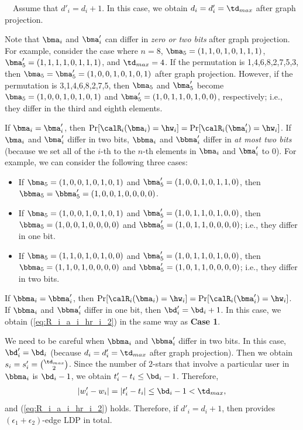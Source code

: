 \smallskip
{}~~Assume that $d'_i = d_i + 1$. 
In this case, we obtain $d_i = d'_i = \td_{max}$ after graph projection. 

Note that $\bma_i$ and $\bma'_i$ can differ in \textit{zero or two bits} after graph projection. 
For example, consider the case where $n=8$, $\bma_5=(1,1,0,1,0,1,1,1)$, $\bma'_5=(1,1,1,1,0,1,1,1)$, and $\td_{max}=4$. 
If the permutation is 1,4,6,8,2,7,5,3, then $\bma_5=\bma'_5=(1,0,0,1,0,1,0,1)$ after graph projection. 
However, if the permutation is 3,1,4,6,8,2,7,5, then $\bma_5$ and $\bma'_5$ become $\bma_5=(1,0,0,1,0,1,0,1)$ and $\bma'_5=(1,0,1,1,0,1,0,0)$, respectively; i.e., they differ in the third and eighth elements. 

If $\bma_i=\bma'_i$, then $\Pr[\calR_i(\bma_i) = \hw_i] = \Pr[\calR_i(\bma'_i) = \hw_i]$. 
If $\bma_i$ and $\bma'_i$ differ in two bits, $\bbma_i$ and $\bbma'_i$ differ in \textit{at most two bits} (because we set all of the $i$-th to the $n$-th elements in $\bma_i$ and $\bma'_i$ to $0$). 
For example, we can consider the following three cases:
\begin{itemize}
    \item If $\bma_5=(1,0,0,1,0,1,0,1)$ and $\bma'_5=(1,0,0,1,0,1,1,0)$, then $\bbma_5=\bbma'_5=(1,0,0,1,0,0,0,0)$. 
    \item If $\bma_5=(1,0,0,1,0,1,0,1)$ and $\bma'_5=(1,0,1,1,0,1,0,0)$, then $\bbma_5=(1,0,0,1,0,0,0,0)$ and $\bbma'_5=(1,0,1,1, 0,0,\allowbreak0,0)$; i.e., they differ in one bit. 
    \item If $\bma_5=(1,1,0,1,0,1,0,0)$ and $\bma'_5=(1,0,1,1,0,1,0,0)$, then $\bbma_5=(1,1,0,1,0,0,0,0)$ and $\bbma'_5=(1,0,1,1,0,0,\allowbreak0,0)$; i.e., they differ in two bits.
\end{itemize}
If $\bbma_i=\bbma'_i$, then $\Pr[\calR_i(\bma_i) = \hw_i] = \Pr[\calR_i(\bma'_i) = \hw_i]$. 
If $\bbma_i$ and $\bbma'_i$ differ in one bit, then $\bd'_i = \bd_i + 1$. 
In this case, we obtain (\ref{eq:R_i_a_i_hr_i_2}) in the same way as \textbf{Case 1}. 

We need to be careful when $\bbma_i$ and $\bbma'_i$ differ in two bits. 
In this case, $\bd'_i = \bd_i$ (because $d_i = d'_i = \td_{max}$ after graph projection). 
Then we obtain $s_i = s'_i = \binom{\td_{max}}{2}$. 
Since the number of $2$-stars that involve a particular user in $\bbma_i$ is $\bd_i - 1$, we obtain $t'_i - t_i \leq \bd_i - 1$. Therefore,
\begin{align*}
|w'_i - w_i| = |t'_i - t_i| \leq \bd_i - 1 < \td_{max},
\end{align*}
and (\ref{eq:R_i_a_i_hr_i_2}) holds. 
Therefore, if $d'_i = d_i + 1$, then 
 provides $(\epsilon_1 + \epsilon_2)$-edge LDP in total. 

